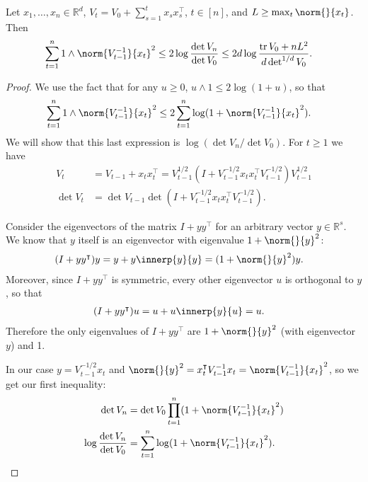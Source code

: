 \documentclass{article}
\newcommand{\inv}[1]{#1^{-1}}
\newcommand{\Real}{\mathds{R}}
\DeclareMathOperator{\tr}{tr}
\newcommand{\transp}[1]{#1^\intercal}
\begin{document}
\begin{lemma}\label{lemma:elliptical-potential}
  Let $x_1,\dotsc,x_n \in \Real^d$,
  $V_t = V_0 + \sum_{s=1}^t x_s \transp{x_s}$, $t\in[n]$, and
  $L \ge \max_t\norm{}{x_t}$. Then
  \begin{align*}
    \sum_{t=1}^n 1 \wedge \norm{\inv{V_{t-1}}}{x_t}^2
    &\le 2\log\frac{\det V_n}{\det V_0} \le 2d\log\frac{\tr V_0+nL^2}{d\det^{1/d} V_0}.
  \end{align*}

  \begin{proof}
    We use the fact that for any $u \ge 0$, $u \wedge 1 \le
    2\log(1+u)$, so that
    \begin{align*}
      \sum_{t=1}^n 1 \wedge \norm{\inv{V_{t-1}}}{x_t}^2
      &\le 2\sum_{t=1}^n \log(1 + \norm{\inv{V_{t-1}}}{x_t}^2).
    \end{align*}
    We will show that this last expression is $\log(\det V_n/\det
    V_0)$.  For $t \ge 1$ we have
    \begin{align*}
      V_t &= V_{t-1} + x_t\transp{x_t}
           = V_{t-1}^{1/2} (I + V_{t-1}^{-1/2}x_t\transp{x_t}V_{t-1}^{-1/2}) V_{t-1}^{1/2} \\
      \det V_t &= \det V_{t-1}\det(I + V_{t-1}^{-1/2}x_t\transp{x_t}V_{t-1}^{-1/2}).
    \end{align*}

    Consider the eigenvectors of the matrix $I+y\transp{y}$ for an
    arbitrary vector $y\in\Real^s$.  We know that $y$ itself is an
    eigenvector with eigenvalue $1+\norm{}{y}^2$:
    \begin{align*}
      (I + y\transp{y})y &= y + y\innerp{y}{y} = (1+\norm{}{y}^2)y.
    \end{align*}
    Moreover, since $I+y\transp{y}$ is symmetric, every other
    eigenvector $u$ is orthogonal to $y$, so that
    \begin{align*}
      (I + y\transp{y})u &= u + u\innerp{y}{u} = u.
    \end{align*}
    Therefore the only eigenvalues of $I+y\transp{y}$ are
    $1+\norm{}{y}^2$ (with eigenvector $y$) and 1.

    In our case $y = V_{t-1}^{-1/2}x_t$ and $\norm{}{y}^2 =
    \transp{x_t}\inv{V_{t-1}}x_t = \norm{\inv{V_{t-1}}}{x_t}^2$, so we get our
    first inequality:
    \begin{align*}
      \det V_n &= \det V_0 \prod_{t=1}^n(1 + \norm{\inv{V_{t-1}}}{x_t}^2) \\
      \log\frac{\det V_n}{\det V_0} &= \sum_{t=1}^n\log(1+\norm{\inv{V_{t-1}}}{x_t}^2).
    \end{align*}


\end{proof}
\end{lemma}
\end{document}
